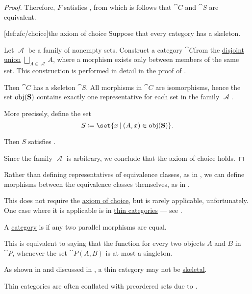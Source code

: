 \begin{proof}
  Therefore, \( F \) satisfies , from which is follows that \( \cat{C} \) and \( \cat{S} \) are equivalent.

  [def:zfc/choice]{the axiom of choice} Suppose that every category has a skeleton.

  Let \( \mscrA \) be a family of nonempty sets. Construct a category \( \cat{C} \)from the \hyperref[def:disjoint_union]{disjoint union} \( \bigsqcup_{A \in \mscrA} A \), where a morphism exists only between members of the same set. This construction is performed in detail in the proof of .

  Then \( \cat{C} \) has a skeleton \( \cat{S} \). All morphisms in \( \cat{C} \) are isomorphisms, hence the set \( \operatorname{obj}(\operatorname{\mathbf{S}}) \) contains exactly one representative for each set in the family \( \mscrA \).

  More precisely, define the set
  \begin{equation*}
    S \coloneqq \set{ x \given (A, x) \in \obj(\cat{S}) }.
  \end{equation*}

  Then \( S \) satisfies .

  Since the family \( \mscrA \) is arbitrary, we conclude that the axiom of choice holds.
\end{proof}

\begin{remark}\label{rem:skeletons_and_thin_categories}
  Rather than defining representatives of equivalence classes, as in , we can define morphisms between the equivalence classes themselves, as in .

  This does not require the \hyperref[def:zfc/choice]{axiom of choice}, but is rarely applicable, unfortunately. One case where it is applicable is in \hyperref[def:thin_category]{thin categories} --- see .
\end{remark}

\begin{definition}\label{def:thin_category}
  A \hyperref[def:category]{category} is  if any two parallel morphisms are equal.

  This is equivalent to saying that the function for every two objects \( A \) and \( B \) in \( \cat{P} \), whenever the set \( \cat{P}(A, B) \) is at most a singleton.

  As shown in  and discussed in , a thin category may not be \hyperref[def:skeletal_category]{skeletal}.

  Thin categories are often conflated with preordered sets due to .
\end{definition}

